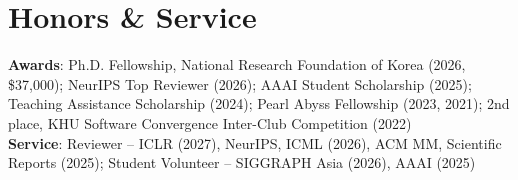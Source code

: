 \documentclass[letterpaper,10pt]{article}
\begin{document}
\section{Honors \& Service}
 \begin{itemize}[leftmargin=0.15in, label={}]
    \small{\item{
     \textbf{Awards}{: Ph.D. Fellowship, National Research Foundation of Korea (2026, \$37,000); NeurIPS Top Reviewer (2026); AAAI Student Scholarship (2025); Teaching Assistance Scholarship (2024); Pearl Abyss Fellowship (2023, 2021); 2nd place, KHU Software Convergence Inter-Club Competition (2022)} \\
     \textbf{Service}{: Reviewer -- ICLR (2027), NeurIPS, ICML (2026), ACM MM, Scientific Reports (2025); Student Volunteer -- SIGGRAPH Asia (2026), AAAI (2025)}
    }}
 \end{itemize}

\end{document}

